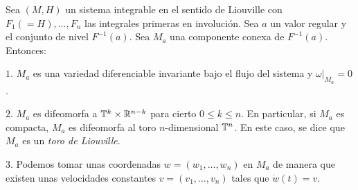 \begin{thm}\label{arnold}
  Sea $(M,H)$ un sistema integrable en el sentido de Liouville con $F_1(=H),\dots,F_n$ las integrales primeras en involución. Sea $a$ un valor regular y el conjunto de nivel $F^{-1}(a)$. Sea $M_a$ una componente conexa de $F^{-1}(a)$.  Entonces:

$1$. $M_a$ es una variedad diferenciable invariante bajo el flujo del sistema y $\left. \omega \right|_{M_a}=0$.
  
$2$. $M_a$ es difeomorfa a $\mathbb{T}^k\times \mathbb{R}^{n-k}$ para cierto $0 \leq k \leq n$. En particular, si $M_a$ es compacta, $M_a$ es difeomorfa al toro $n$-dimensional $\mathbb{T}^n$. En este caso, se dice que $M_a$ es un \emph{toro de Liouville}. 
 
$3$. Podemos tomar unas coordenadas $w=(w_1,\dots, w_n)$ en $M_a$ de manera que existen unas velocidades constantes $v=(v_{1},\dots,v_{n})$ tales que $\dot w (t)=v$. 
\end{thm}

